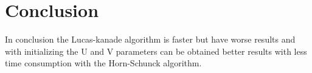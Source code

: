 \documentclass[9pt]{IEEEtran}
\begin{document}
\section{Conclusion}
In conclusion the Lucas-kanade algorithm is faster but have worse results and with initializing the U and V parameters can be obtained better results with less time consumption with the Horn-Schunck algorithm.



\end{document}
